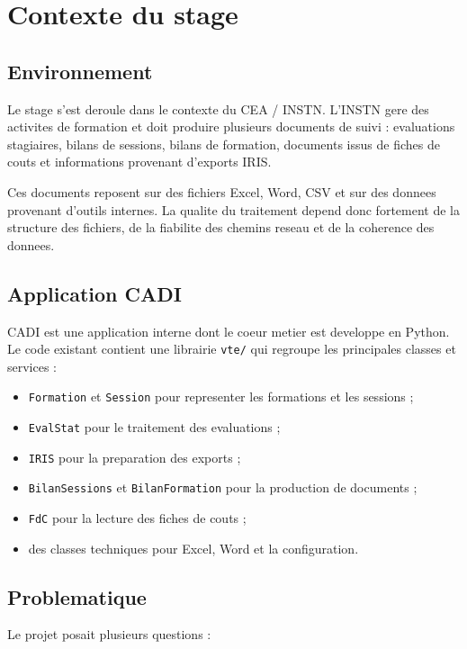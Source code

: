 \documentclass[11pt,a4paper]{report}
\begin{document}
\chapter{Contexte du stage}

\section{Environnement}

Le stage s'est deroule dans le contexte du CEA / INSTN. L'INSTN gere des activites de formation et doit produire plusieurs documents de suivi : evaluations stagiaires, bilans de sessions, bilans de formation, documents issus de fiches de couts et informations provenant d'exports IRIS.

Ces documents reposent sur des fichiers Excel, Word, CSV et sur des donnees provenant d'outils internes. La qualite du traitement depend donc fortement de la structure des fichiers, de la fiabilite des chemins reseau et de la coherence des donnees.

\section{Application CADI}

CADI est une application interne dont le coeur metier est developpe en Python. Le code existant contient une librairie \texttt{vte/} qui regroupe les principales classes et services :

\begin{itemize}
  \item \texttt{Formation} et \texttt{Session} pour representer les formations et les sessions ;
  \item \texttt{EvalStat} pour le traitement des evaluations ;
  \item \texttt{IRIS} pour la preparation des exports ;
  \item \texttt{BilanSessions} et \texttt{BilanFormation} pour la production de documents ;
  \item \texttt{FdC} pour la lecture des fiches de couts ;
  \item des classes techniques pour Excel, Word et la configuration.
\end{itemize}

\section{Problematique}

Le projet posait plusieurs questions :
\end{document}
